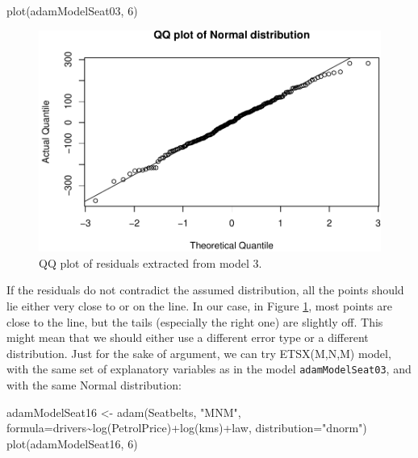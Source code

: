 \documentclass[
]{book}
\newenvironment{Shaded}{\begin{snugshade}}{\end{snugshade}}
\newcommand{\AttributeTok}[1]{\textcolor[rgb]{0.77,0.63,0.00}{#1}}
\newcommand{\DecValTok}[1]{\textcolor[rgb]{0.00,0.00,0.81}{#1}}
\newcommand{\FunctionTok}[1]{\textcolor[rgb]{0.00,0.00,0.00}{#1}}
\newcommand{\NormalTok}[1]{#1}
\newcommand{\OtherTok}[1]{\textcolor[rgb]{0.56,0.35,0.01}{#1}}
\newcommand{\SpecialCharTok}[1]{\textcolor[rgb]{0.00,0.00,0.00}{#1}}
\newcommand{\StringTok}[1]{\textcolor[rgb]{0.31,0.60,0.02}{#1}}
\theoremstyle{definition}
\theoremstyle{definition}
\theoremstyle{definition}
\theoremstyle{definition}
\theoremstyle{remark}
\begin{document}
\begin{Shaded}
\begin{Highlighting}[]
\FunctionTok{plot}\NormalTok{(adamModelSeat03, }\DecValTok{6}\NormalTok{)}
\end{Highlighting}
\end{Shaded}

\begin{figure}
\centering
\includegraphics{Svetunkov--2022----ADAM_files/figure-latex/adamModelSeat03QQ-1.pdf}
\caption{\label{fig:adamModelSeat03QQ}QQ plot of residuals extracted from model 3.}
\end{figure}

If the residuals do not contradict the assumed distribution, all the points should lie either very close to or on the line. In our case, in Figure \ref{fig:adamModelSeat03QQ}, most points are close to the line, but the tails (especially the right one) are slightly off. This might mean that we should either use a different error type or a different distribution. Just for the sake of argument, we can try ETSX(M,N,M) model, with the same set of explanatory variables as in the model \texttt{adamModelSeat03}, and with the same Normal distribution:

\begin{Shaded}
\begin{Highlighting}[]
\NormalTok{adamModelSeat16 }\OtherTok{\textless{}{-}} \FunctionTok{adam}\NormalTok{(Seatbelts, }\StringTok{"MNM"}\NormalTok{,}
                        \AttributeTok{formula=}\NormalTok{drivers}\SpecialCharTok{\textasciitilde{}}\FunctionTok{log}\NormalTok{(PetrolPrice)}\SpecialCharTok{+}\FunctionTok{log}\NormalTok{(kms)}\SpecialCharTok{+}\NormalTok{law,}
                        \AttributeTok{distribution=}\StringTok{"dnorm"}\NormalTok{)}
\FunctionTok{plot}\NormalTok{(adamModelSeat16, }\DecValTok{6}\NormalTok{)}
\end{Highlighting}
\end{Shaded}
\end{document}
